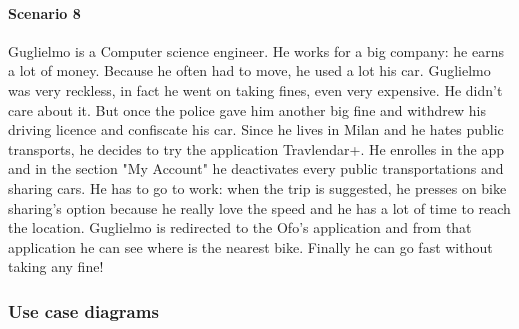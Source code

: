\documentclass[12pt,titlepage]{article}
\begin{document}
\paragraph{Scenario 8}
Guglielmo is a Computer science engineer. He works for a big company: he earns a lot of money. Because he often had to move, he used a lot his car. Guglielmo was very reckless, in fact he went on taking fines, even very expensive. He didn't care about it. But once the police gave him another big fine and  withdrew his driving licence and confiscate his car.
Since he lives in Milan and he hates public transports, he decides to try the application Travlendar+. He enrolles in the app and in the section "My Account" he deactivates every public transportations and sharing cars. He has to go to work: when the trip is suggested, he presses on bike sharing's option because he really love the speed and he has a lot of time to reach the location. Guglielmo is redirected to the Ofo's application and from that application he can see where is the nearest bike. Finally he can go fast without taking any fine!

\subsubsection{Use case diagrams}\label{sec:mod1}
\end{document}
